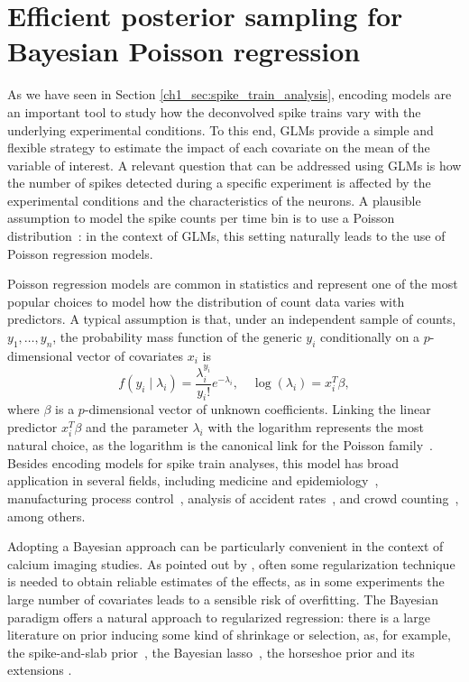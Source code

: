 \chapter{Efficient posterior sampling for Bayesian Poisson regression}


As we have seen in Section \ref{ch1_sec:spike_train_analysis}, encoding models are an important tool to study how the deconvolved spike trains vary with the underlying experimental conditions. To this end, GLMs provide a simple and flexible strategy to estimate the impact of each covariate on the mean of the variable of interest.
A relevant question that can be addressed using GLMs is how the number of spikes detected during a specific experiment is affected by the experimental conditions and the characteristics of the neurons. A plausible assumption to model the spike counts per time bin is to use a Poisson distribution~\citep{paninski2007}: in the context of GLMs, this setting naturally leads to the use of Poisson regression models. 

Poisson regression models are common in statistics and represent one of the most popular choices to model how the distribution of count data varies with predictors. A typical assumption is that, under an independent sample of counts, $y_1, \dots, y_n$, the probability mass function of the generic $y_i$ conditionally on a $p$-dimensional vector of covariates $x_i$ is
\begin{equation}
f(y_i \mid \lambda_i) =  \frac {\lambda_i^{y_i}}{{y_i}!}e^{-\lambda_i}, \quad \log(\lambda_i) = x_i^T \beta,
\label{ch2_eq:model0}
\end{equation}
where $\beta$ is a $p$-dimensional vector of unknown coefficients. Linking the linear predictor $x_i^T \beta$ and the parameter $\lambda_i$ with the logarithm represents the most natural choice, as the logarithm is the canonical link for the Poisson family~\citep{nelder1972glm}.
Besides encoding models for spike train analyses, this model has broad application in several fields, including medicine and epidemiology~\citep{Frome1983, frome1985, Hutchinson2005}, manufacturing process control~\citep{lambert1992}, analysis of accident rates~\citep{Sarath1990, Miaou1994}, and crowd counting~\citep{chan2009}, among others.

Adopting a Bayesian approach can be particularly convenient in the context of calcium imaging studies. As pointed out by \citet{paninski2007}, often some regularization technique is needed to obtain reliable estimates of the effects, as in some experiments the large number of covariates leads to a sensible risk of overfitting.
The Bayesian paradigm offers a natural approach to regularized regression: there is a large literature on prior inducing some kind of shrinkage or selection, as, for example, the spike-and-slab prior~\citep{mitchell1988}, the Bayesian lasso~\citep{park2008bayesian}, the horseshoe prior and its extensions \citep{carvalho2010horseshoe, Piironen2017}.

